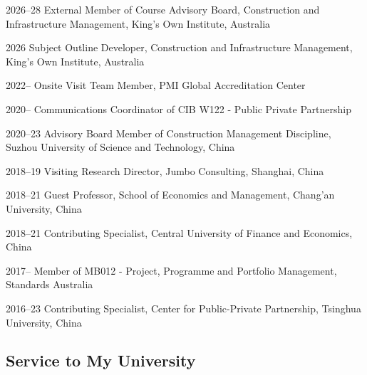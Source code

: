 \documentclass[11pt,a4paper]{report} %
\begin{document}
    \begin{tablist}

        \item[2026--28] \tab{}External Member of Course Advisory Board, Construction and Infrastructure Management, King’s Own Institute, Australia

        \item[2026] \tab{}Subject Outline Developer, Construction and Infrastructure Management, King’s Own Institute, Australia
        
        \item[2022--] \tab{}Onsite Visit Team Member, PMI Global Accreditation Center

        \item[2020--] \tab{}Communications Coordinator of CIB W122 - Public Private Partnership

        \item[2020--23] \tab{}Advisory Board Member of Construction Management Discipline, Suzhou University of Science and Technology, China

        \item[2018--19] \tab{}Visiting Research Director, Jumbo Consulting, Shanghai, China

        \item[2018--21] \tab{}Guest Professor, School of Economics and Management, Chang'an University, China 

        \item[2018--21] \tab{}Contributing Specialist, Central University of Finance and Economics, China

        \item[2017--] \tab{}Member of MB012 - Project, Programme and Portfolio Management, Standards Australia

        \item[2016--23] \tab{}Contributing Specialist, Center for Public-Private Partnership, Tsinghua University, China

    \end{tablist}

    \subsection*{Service to My University}
\end{document}
